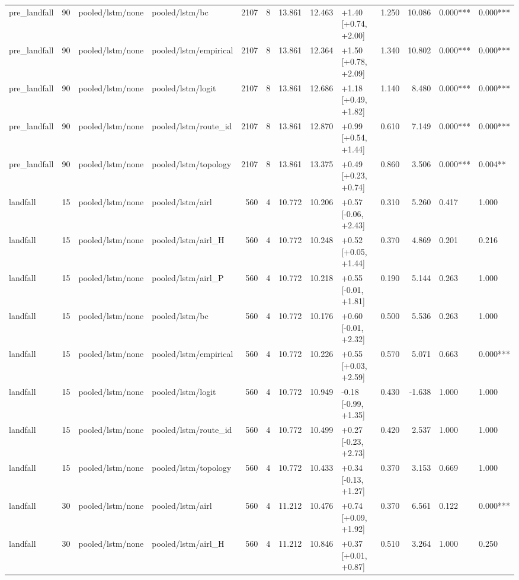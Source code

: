 \begin{tabular}{lrllrrrrlrrll}
pre_landfall & 90 & pooled/lstm/none & pooled/lstm/bc & 2107 & 8 & 13.861 & 12.463 & +1.40 [+0.74, +2.00] & 1.250 & 10.086 & 0.000*** & 0.000*** \\
pre_landfall & 90 & pooled/lstm/none & pooled/lstm/empirical & 2107 & 8 & 13.861 & 12.364 & +1.50 [+0.78, +2.09] & 1.340 & 10.802 & 0.000*** & 0.000*** \\
pre_landfall & 90 & pooled/lstm/none & pooled/lstm/logit & 2107 & 8 & 13.861 & 12.686 & +1.18 [+0.49, +1.82] & 1.140 & 8.480 & 0.000*** & 0.000*** \\
pre_landfall & 90 & pooled/lstm/none & pooled/lstm/route_id & 2107 & 8 & 13.861 & 12.870 & +0.99 [+0.54, +1.44] & 0.610 & 7.149 & 0.000*** & 0.000*** \\
pre_landfall & 90 & pooled/lstm/none & pooled/lstm/topology & 2107 & 8 & 13.861 & 13.375 & +0.49 [+0.23, +0.74] & 0.860 & 3.506 & 0.000*** & 0.004** \\
landfall & 15 & pooled/lstm/none & pooled/lstm/airl & 560 & 4 & 10.772 & 10.206 & +0.57 [-0.06, +2.43] & 0.310 & 5.260 & 0.417 & 1.000 \\
landfall & 15 & pooled/lstm/none & pooled/lstm/airl_H & 560 & 4 & 10.772 & 10.248 & +0.52 [+0.05, +1.44] & 0.370 & 4.869 & 0.201 & 0.216 \\
landfall & 15 & pooled/lstm/none & pooled/lstm/airl_P & 560 & 4 & 10.772 & 10.218 & +0.55 [-0.01, +1.81] & 0.190 & 5.144 & 0.263 & 1.000 \\
landfall & 15 & pooled/lstm/none & pooled/lstm/bc & 560 & 4 & 10.772 & 10.176 & +0.60 [-0.01, +2.32] & 0.500 & 5.536 & 0.263 & 1.000 \\
landfall & 15 & pooled/lstm/none & pooled/lstm/empirical & 560 & 4 & 10.772 & 10.226 & +0.55 [+0.03, +2.59] & 0.570 & 5.071 & 0.663 & 0.000*** \\
landfall & 15 & pooled/lstm/none & pooled/lstm/logit & 560 & 4 & 10.772 & 10.949 & -0.18 [-0.99, +1.35] & 0.430 & -1.638 & 1.000 & 1.000 \\
landfall & 15 & pooled/lstm/none & pooled/lstm/route_id & 560 & 4 & 10.772 & 10.499 & +0.27 [-0.23, +2.73] & 0.420 & 2.537 & 1.000 & 1.000 \\
landfall & 15 & pooled/lstm/none & pooled/lstm/topology & 560 & 4 & 10.772 & 10.433 & +0.34 [-0.13, +1.27] & 0.370 & 3.153 & 0.669 & 1.000 \\
landfall & 30 & pooled/lstm/none & pooled/lstm/airl & 560 & 4 & 11.212 & 10.476 & +0.74 [+0.09, +1.92] & 0.370 & 6.561 & 0.122 & 0.000*** \\
landfall & 30 & pooled/lstm/none & pooled/lstm/airl_H & 560 & 4 & 11.212 & 10.846 & +0.37 [+0.01, +0.87] & 0.510 & 3.264 & 1.000 & 0.250 \\

\end{tabular}
